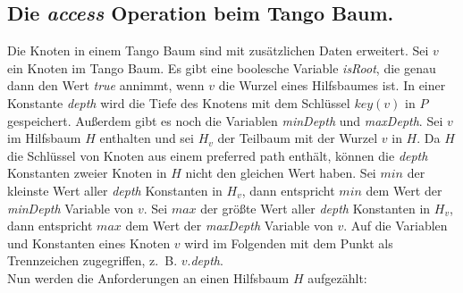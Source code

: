 \documentclass[a4paper,12pt]{article}
\begin{document}
\subsection{Die \textit{access} Operation beim Tango Baum.}
Die Knoten in einem Tango Baum sind mit zusätzlichen Daten erweitert. Sei $v$ ein Knoten im Tango Baum. Es gibt eine boolesche Variable \textit{isRoot}, die genau dann den Wert \textit{true} annimmt, wenn $v$ die Wurzel eines Hilfsbaumes ist. In einer Konstante \textit{depth} wird die Tiefe des Knotens mit dem Schlüssel $\mathit{key}\left(v\right)$ in $P$ gespeichert. Außerdem gibt es noch die Variablen \textit{minDepth} und \textit{maxDepth}. Sei $v$ im Hilfsbaum $H$ enthalten und sei $H_v$ der Teilbaum mit der Wurzel $v$ in $H$. Da $H$ die Schlüssel von Knoten aus einem preferred path enthält, können die \textit{depth} Konstanten zweier Knoten in $H$ nicht den gleichen Wert haben. Sei $\mathit{min}$ der kleinste Wert aller \textit{depth} Konstanten in $H_v$, dann entspricht $\mathit{min}$ dem  Wert der \textit{minDepth} Variable von $v$. Sei $\mathit{max}$ der größte Wert aller \textit{depth} Konstanten in $H_v$, dann entspricht $\mathit{max}$ dem  Wert der \textit{maxDepth} Variable von $v$. Auf die Variablen und Konstanten eines Knoten $v$ wird im Folgenden mit dem Punkt als Trennzeichen zugegriffen, \mbox{z. B.} $v$.\textit{depth}. \\
Nun werden die Anforderungen an einen Hilfsbaum $H$ aufgezählt:
\end{document}
